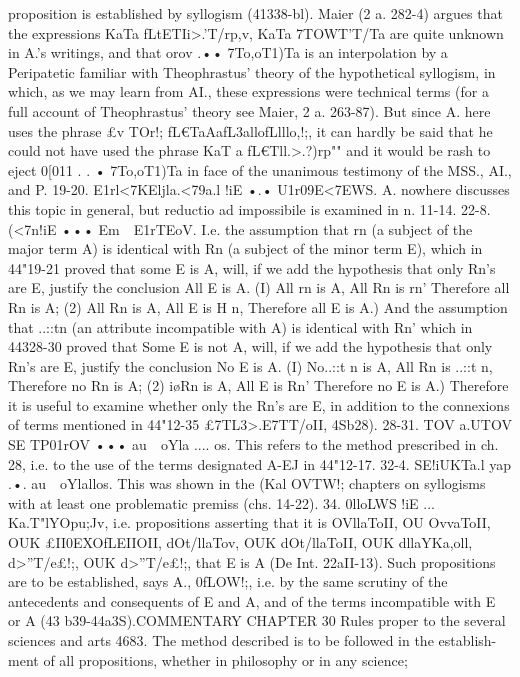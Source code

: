 {{{{{{{{{{{{{{{{{{{proposition is established by syllogism (41338-bl).
Maier (2 a. 282-4) argues that the expressions KaTa fLtETIi>.'T/rp,v,
KaTa 7TOWT'T/Ta are quite unknown in A.'s writings, and that orov .••
7To,oT1)Ta is an interpolation by a Peripatetic familiar with
Theophrastus' theory of the hypothetical syllogism, in which, as
we may learn from AI., these expressions were technical terms
(for a full account of Theophrastus' theory see Maier, 2 a. 263-87).
But since A. here uses the phrase £v TOr!; fL€TaAafL{3allofLlllo,!;, it
can hardly be said that he could not have used the phrase KaT a
fL€Tll.>.?)rp"" and it would be rash to eject 0[011 . . • 7To,oT1)Ta in face
of the unanimous testimony of the MSS., AI., and P.
19-20. E1rl<7KEljla.<79a.l !iE •.• U1r09E<7EWS. A. nowhere discusses
this topic in general, but reductio ad impossibile is examined in
n. 11-14.
22-8. (<7n!iE ••• Em~~E1rTEoV. I.e. the assumption that rn
(a subject of the major term A) is identical with Rn (a subject of
the minor term E), which in 44"19-21 proved that some E is A,
will, if we add the hypothesis that only Rn's are E, justify the
conclusion All E is A. ({I) All rn is A, All Rn is rn' Therefore
all Rn is A; (2) All Rn is A, All E is H n, Therefore all E is A.)
And the assumption that ..::tn (an attribute incompatible with A)
is identical with Rn' which in 44328-30 proved that Some E is
not A, will, if we add the hypothesis that only Rn's are E, justify
the conclusion No E is A. ({I) No..::t n is A, All Rn is ..::t n, Therefore
no Rn is A; (2) i\o Rn is A, All E is Rn' Therefore no E is A.)
Therefore it is useful to examine whether only the Rn's are E,
in addition to the connexions of terms mentioned in 44"12-35
£7TL{3>.E7TT/oII, 4Sb28).
28-31. TOV a.UTOV SE TP01rOV ••• au~~oYla .... os. This refers
to the method prescribed in ch. 28, i.e. to the use of the terms
designated A-EJ in 44"12-17.
32-4. SE!iUKTa.l yap .•. au~~oYlallos. This was shown in the
(Kal OVTW!;
chapters on syllogisms with at least one problematic premiss
(chs. 14-22).
34. 0lloLWS !iE ... Ka.T"lYOpu;Jv, i.e. propositions asserting that
it is OVllaToII, OU OvvaToII, OUK £II0EXOfLEIIOII, dOt/llaTov, OUK dOt/llaToII, OUK
dllaYKa,oll, d>''T/e£!;, OUK d>''T/e£!;, that E is A (De Int. 22aII-13).
Such propositions are to be established, says A., 0fLO{W!;, i.e. by
the same scrutiny of the antecedents and consequents of E and
A, and of the terms incompatible with E or A (43 b39-44a3S).COMMENTARY
CHAPTER 30
Rules proper to the several sciences and arts
4683. The method described is to be followed in the establish-
ment of all propositions, whether in philosophy or in any science;
}}}}}}}}}}}}}}}}}}}}}}}}
